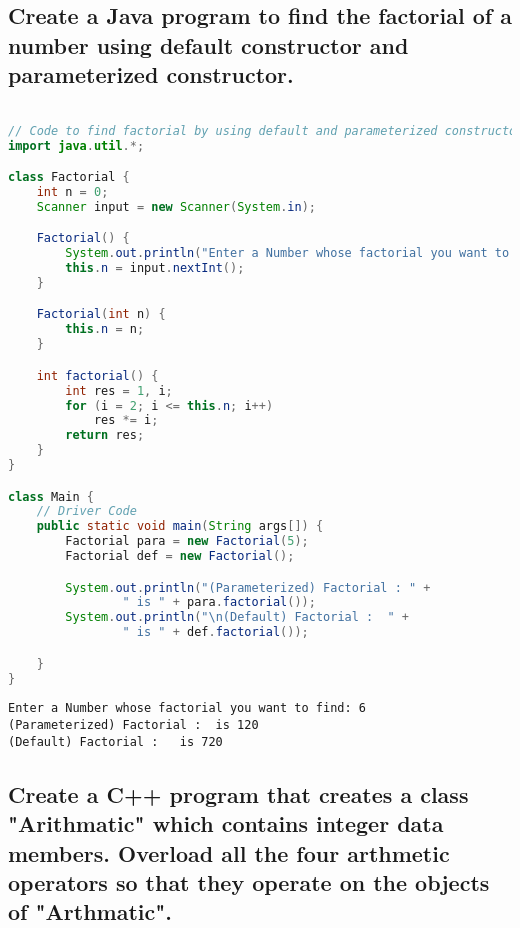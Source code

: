 \documentclass[11pt]{article}
\begin{document}
\subsection{Create a Java program to find the factorial of a number using default constructor and parameterized constructor.}

\begin{lstlisting}[language=java]

// Code to find factorial by using default and parameterized constructor. 
import java.util.*;

class Factorial {
    int n = 0;
    Scanner input = new Scanner(System.in);

    Factorial() {
        System.out.println("Enter a Number whose factorial you want to find: ");
        this.n = input.nextInt();
    }

    Factorial(int n) {
        this.n = n;
    }

    int factorial() {
        int res = 1, i;
        for (i = 2; i <= this.n; i++)
            res *= i;
        return res;
    }
}

class Main {
    // Driver Code
    public static void main(String args[]) {
        Factorial para = new Factorial(5);
        Factorial def = new Factorial();

        System.out.println("(Parameterized) Factorial : " +
                " is " + para.factorial());
        System.out.println("\n(Default) Factorial :  " +
                " is " + def.factorial());

    }
}

\end{lstlisting}

\begin{verbatim}
Enter a Number whose factorial you want to find: 6
(Parameterized) Factorial :  is 120
(Default) Factorial :   is 720
\end{verbatim}
\subsection{Create a C++ program that creates a class "Arithmatic" which contains integer data members. Overload all the four arthmetic operators so that they operate on the objects of "Arthmatic". }
\end{document}
